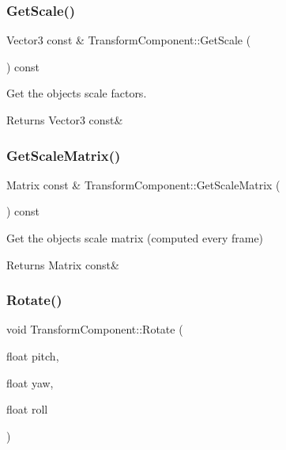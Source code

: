\subsubsection{\texorpdfstring{Get\+Scale()}{GetScale()}}
{\footnotesize\ttfamily Vector3 const  \& Transform\+Component\+::\+Get\+Scale (\begin{DoxyParamCaption}{ }\end{DoxyParamCaption}) const}



Get the object\textquotesingle{}s scale factors. 

\begin{DoxyReturn}{Returns}
Vector3 const\& 
\end{DoxyReturn}
\mbox{\label{classTransformComponent_af55f4a1e6167f8a260e581850848299d}} 
\subsubsection{\texorpdfstring{Get\+Scale\+Matrix()}{GetScaleMatrix()}}
{\footnotesize\ttfamily Matrix const  \& Transform\+Component\+::\+Get\+Scale\+Matrix (\begin{DoxyParamCaption}{ }\end{DoxyParamCaption}) const}



Get the object\textquotesingle{}s scale matrix (computed every frame) 

\begin{DoxyReturn}{Returns}
Matrix const\& 
\end{DoxyReturn}
\mbox{\label{classTransformComponent_a305b12762fc44d18713ebe31664c92f2}} 
\subsubsection{\texorpdfstring{Rotate()}{Rotate()}\hspace{0.1cm}{\footnotesize\ttfamily [1/2]}}
{\footnotesize\ttfamily void Transform\+Component\+::\+Rotate (\begin{DoxyParamCaption}\item[{float}]{pitch,  }\item[{float}]{yaw,  }\item[{float}]{roll }\end{DoxyParamCaption})}



